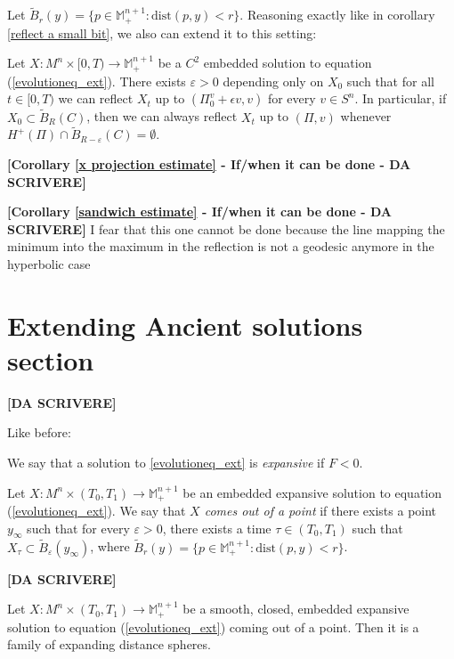 Let $\tilde{B}_r(y) = \{ p \in \mathbb{M}^{n+1}_+  : \mathrm{dist}(p, y) < r \}$. Reasoning exactly like in corollary \ref{reflect a small bit}, we also can extend it to this setting:  
\begin{cor}
	Let $X:M^n\times [0,T) \rightarrow \mathbb{M}^{n+1}_+$ be a $C^2$ embedded solution to equation (\ref{evolutioneq_ext}). There exists $\varepsilon>0$ depending only on $X_0$ such that for all $t\in[0, T)$ we can reflect $X_t$ up to $(\Pi_0^v +\epsilon v, v)$ for every $v \in S^n$. In particular, if $X_0 \subset \tilde{B}_R(C)$, then we can always reflect $X_t$ up to $(\Pi, v)$ whenever $H^+(\Pi)\cap \tilde{B}_{R-\varepsilon}(C)=\emptyset$.\label{reflect a small bit ext}
\end{cor}

{\Large \textbf{[Corollary \ref{x projection estimate} - If/when it can be done  - DA SCRIVERE]}}

{\Large \textbf{[Corollary \ref{sandwich estimate} - If/when it can be done  - DA SCRIVERE]}} I fear that this one cannot be done because the line mapping the minimum into the maximum in the reflection is not a geodesic anymore in the hyperbolic case


\section{Extending Ancient solutions section}

{\Large \textbf{[DA SCRIVERE]}}

Like before: 
\begin{defin}
	We say that a solution to \ref{evolutioneq_ext} is {\em expansive} if $F<0$. 
\end{defin}
\begin{defin}
	Let $ X : M^n \times (T_0, T_1) \to \mathbb{M}^{n+1}_+ $ be an embedded expansive solution to equation (\ref{evolutioneq_ext}). We say that {\em $X$ comes out of a point} if there exists a point $y_\infty$ such that for every $\varepsilon>0$, there exists a time $\tau \in  (T_0, T_1)$ such that $X_\tau \subset \tilde{B}_\varepsilon(y_\infty)$, where $\tilde{B}_r(y) = \{ p \in \mathbb{M}^{n+1}_+  : \mathrm{dist}(p, y) < r \}$.
\end{defin}

{\Large \textbf{[DA SCRIVERE]}}


\begin{theorem}
	Let $ X : M^n \times (T_0, T_1) \to \mathbb{M}^{n+1}_+ $ be a smooth, closed, embedded expansive solution to equation (\ref{evolutioneq_ext}) coming out of a point. Then it is a family of expanding distance spheres.
\end{theorem}


